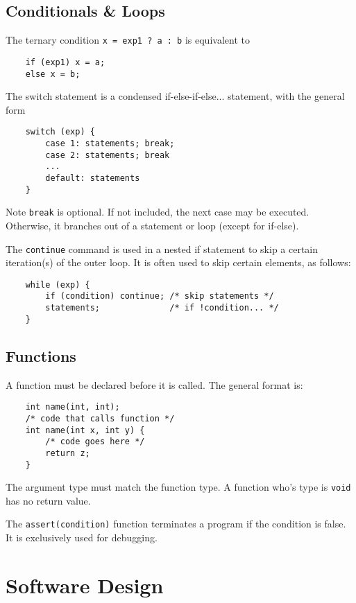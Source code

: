 \documentclass{tufte-book}
\begin{document}
\section{Conditionals \& Loops}
The ternary condition \lstinline{x = exp1 ? a : b} is equivalent to
\begin{lstlisting}
    if (exp1) x = a;
    else x = b;
\end{lstlisting}
The switch statement is a condensed if-else-if-else... statement, with the general form
\begin{lstlisting}
    switch (exp) {
        case 1: statements; break;
        case 2: statements; break
        ...
        default: statements
    }
\end{lstlisting}
Note \lstinline{break} is optional. If not included, the next case may be executed. Otherwise, it branches out of a statement or loop (except for if-else).

\bigskip
The \lstinline{continue} command is used in a nested if statement to skip a certain iteration(s) of the outer loop. It is often used to skip certain elements, as follows:
\begin{lstlisting}
    while (exp) {
        if (condition) continue; /* skip statements */
        statements;              /* if !condition... */
    }
\end{lstlisting}

\section{Functions}

A function must be declared before it is called. The general format is:
\begin{lstlisting}
    int name(int, int);
    /* code that calls function */
    int name(int x, int y) {
        /* code goes here */
        return z;
    }
\end{lstlisting}
The argument type must match the function type. A function who's type is \lstinline{void} has no return value.

\bigskip
The \lstinline{assert(condition)} function terminates a program if the condition is false. It is exclusively used for debugging.

\chapter{Software Design}
\end{document}

